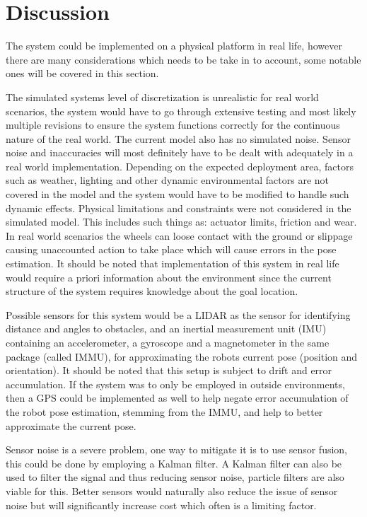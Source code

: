 \section{Discussion}

The system could be implemented on a physical platform in real life, however there are many considerations which needs to be take in to account, some notable ones will be covered in this section.

The simulated systems level of discretization is unrealistic for real world scenarios, the system would have to go through extensive testing and most likely multiple revisions to ensure the system functions correctly for the continuous nature of the real world.
The current model also has no simulated noise. Sensor noise and inaccuracies will most definitely have to be dealt with adequately in a real world implementation.
Depending on the expected deployment area, factors such as weather, lighting and other dynamic environmental factors are not covered in the model and the system would have to be modified to handle such dynamic effects.
Physical limitations and constraints were not considered in the simulated model. This includes such things as: actuator limits, friction and wear.
In real world scenarios the wheels can loose contact with the ground or slippage causing unaccounted action to take place which will cause errors in the pose estimation.
It should be noted that implementation of this system in real life would require a priori information about the environment since the current structure of the system requires knowledge about the goal location.

Possible sensors for this system would be a LIDAR as the sensor for identifying distance and angles to obstacles, and an inertial measurement unit (IMU) containing an accelerometer, a gyroscope and a magnetometer in the same package (called IMMU), for approximating the robots current pose (position and orientation). It should be noted that this setup is subject to drift and error accumulation. If the system was to only be employed in outside environments, then a GPS could be implemented as well to help negate error accumulation of the robot pose estimation, stemming from the IMMU, and help to better approximate the current pose.

Sensor noise is a severe problem, one way to mitigate it is to use sensor fusion, this could be done by employing a Kalman filter. A Kalman filter can also be used to filter the signal and thus reducing sensor noise, particle filters are also viable for this.
Better sensors would naturally also reduce the issue of sensor noise but will significantly increase cost which often is a limiting factor.

